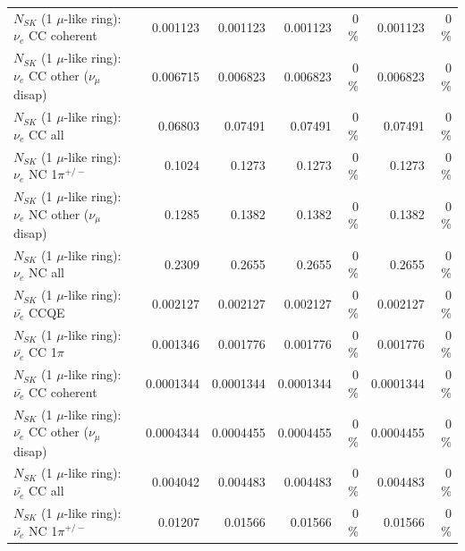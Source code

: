 \begin{table}
\begin{tabular}{| l | r | r | r  r | r  r |}
                               $N_{SK}$ (1 $\mu$-like ring): $\nu_e$ CC coherent &        0.001123 &        0.001123 &        0.001123 &        0 \%  &        0.001123 &        0 \%  \\ 
                $N_{SK}$ (1 $\mu$-like ring): $\nu_e$ CC other ($\nu_\mu$ disap) &        0.006715 &        0.006823 &        0.006823 &        0 \%  &        0.006823 &        0 \%  \\ 
                                  $N_{SK}$ (1 $\mu$-like ring): $\nu_{e}$ CC all &         0.06803 &         0.07491 &         0.07491 &        0 \%  &         0.07491 &        0 \%  \\ 
\hline
                           $N_{SK}$ (1 $\mu$-like ring): $\nu_e$ NC 1$\pi^{+/-}$ &          0.1024 &          0.1273 &          0.1273 &        0 \%  &          0.1273 &        0 \%  \\ 
                $N_{SK}$ (1 $\mu$-like ring): $\nu_e$ NC other ($\nu_\mu$ disap) &          0.1285 &          0.1382 &          0.1382 &        0 \%  &          0.1382 &        0 \%  \\ 
                                  $N_{SK}$ (1 $\mu$-like ring): $\nu_{e}$ NC all &          0.2309 &          0.2655 &          0.2655 &        0 \%  &          0.2655 &        0 \%  \\ 
\hline
\hline
\hline
                                $N_{SK}$ (1 $\mu$-like ring): $\bar{\nu_e}$ CCQE &        0.002127 &        0.002127 &        0.002127 &        0 \%  &        0.002127 &        0 \%  \\ 
                           $N_{SK}$ (1 $\mu$-like ring): $\bar{\nu_e}$ CC 1$\pi$ &        0.001346 &        0.001776 &        0.001776 &        0 \%  &        0.001776 &        0 \%  \\ 
                         $N_{SK}$ (1 $\mu$-like ring): $\bar{\nu_e}$ CC coherent &       0.0001344 &       0.0001344 &       0.0001344 &        0 \%  &       0.0001344 &        0 \%  \\ 
          $N_{SK}$ (1 $\mu$-like ring): $\bar{\nu_e}$ CC other ($\nu_\mu$ disap) &       0.0004344 &       0.0004455 &       0.0004455 &        0 \%  &       0.0004455 &        0 \%  \\ 
                            $N_{SK}$ (1 $\mu$-like ring): $\bar{\nu_{e}}$ CC all &        0.004042 &        0.004483 &        0.004483 &        0 \%  &        0.004483 &        0 \%  \\ 
\hline
                     $N_{SK}$ (1 $\mu$-like ring): $\bar{\nu_e}$ NC 1$\pi^{+/-}$ &         0.01207 &         0.01566 &         0.01566 &        0 \%  &         0.01566 &        0 \%  \\ 

\end{tabular}
\end{table}
